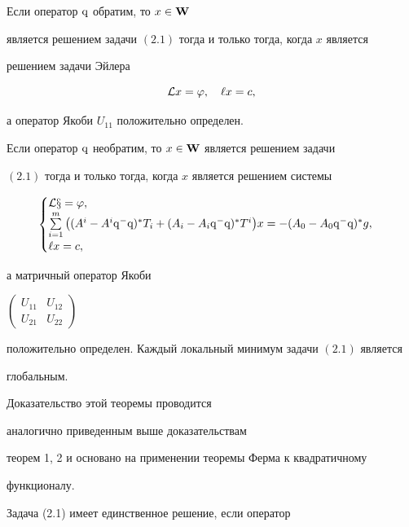 \begin{thm} Если оператор $\mathrm{q}$ обратим, то $x\in\bold W{}$


является решением задачи $(2.1)$ тогда и только тогда, когда $x$ является


решением задачи Эйлера


$$


{\cal L}x=\varphi,\quad \ell x=c,


$$


а оператор Якоби $U_{11}$ положительно определен.


Если оператор $\mathrm{q}$ необратим, то $x\in\bold W{}$ является решением задачи


$(2.1)$ тогда и только тогда, когда $x$ является решением системы


$$


\begin{cases}


\cal L x=\varphi,\\


\sum\limits_{i=1}^m\big((A^i-A^i\q^-\q)^*T_i+


(A_i-A_i\q^-\q)^* T^i\big)x=-(A_0-A_0\q^-\q)^*g,\\


\ell x=c,


\end{cases}


$$


а матричный оператор Якоби


$\begin{pmatrix} U_{11}&U_{12}\\U_{21}&U_{22}\end{pmatrix}$


положительно определен. Каждый локальный минимум задачи $(2.1)$ является


глобальным.


\end{thm}





Доказательство этой теоремы проводится


аналогично приведенным выше доказательствам


теорем 1, 2 и основано на применении теоремы Ферма к квадратичному


функционалу.





Задача (2.1) имеет единственное решение, если оператор


